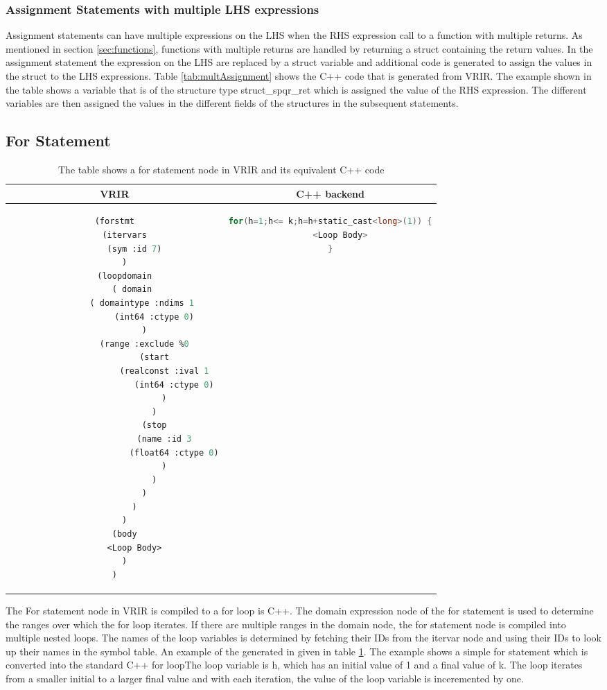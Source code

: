 \subsubsection{Assignment Statements with multiple LHS expressions}
Assignment statements can have multiple expressions on the LHS when the RHS expression call to a function  with multiple returns. As mentioned in section \ref{sec:functions}, functions with multiple returns are handled by returning a struct containing the return values. In the assignment statement the expression on the LHS are replaced by a struct variable and additional code is generated to assign the values in the struct to the LHS expressions. Table \ref{tab:multAssignment} shows the C++ code that is generated from VRIR. The example shown in the table shows a variable that is of the structure type struct\_spqr\_ret which is assigned the value of the RHS expression. The different variables are then assigned the values in the different fields of the structures in the subsequent statements.
\subsection{For Statement}
\begin{table}[htbp]
\begin{tabular}{|c|c|}
\hline 
VRIR & C++ backend \\
\hline 
{
\begin{lstlisting}[language=lisp, frame=none, numbers=none]
(forstmt
	(itervars
		(sym :id 7)
	)
	(loopdomain
		( domain 
			( domaintype :ndims 1 
				(int64 :ctype 0)
			)
			(range :exclude %0
				(start
					(realconst :ival 1
						(int64 :ctype 0)
					)
				)
				(stop
					(name :id 3
						(float64 :ctype 0)
					)
				)
			)
		)
	)
	(body
		<Loop Body>
	)
)

\end{lstlisting}
} & 
{
\begin{lstlisting}[language=c,frame=none, numbers=none]
for(h=1;h<= k;h=h+static_cast<long>(1)) {
	<Loop Body>
}
\end{lstlisting}
} \\
\hline
\end{tabular}
\caption[For Statement]{The table shows a for statement node in VRIR and its equivalent C++ code}
\label{tab:forStmt}
\end{table}
The For statement node in VRIR is compiled to a for loop is C++. The domain expression node of the for statement is used to determine the ranges over which the for loop iterates. If there are multiple ranges in the domain node, the for statement node is compiled into multiple nested loops. The names of the loop variables is determined by fetching their IDs from the itervar node and using their IDs to look up their names in the symbol table. An example of the generated in given in table \ref{tab:forStmt}. The example shows a simple for statement which is converted into the standard C++ for loopThe loop variable is h, which has an initial value of 1 and a final value of k. The loop iterates from a smaller initial to a larger final value and with each iteration, the value of the loop variable is inceremented by one. 

